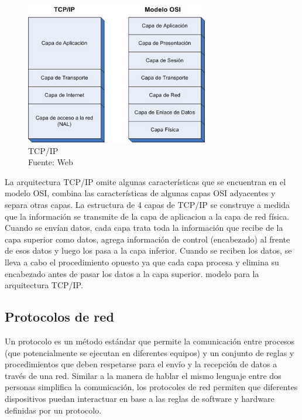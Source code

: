 \begin{figure}[H]
    \begin{center}
        \includegraphics[width=8cm]{img/capitulo_2/tcp_ip_osi.jpg}
    \end{center}
    \caption{TCP/IP\\Fuente: Web}
    \label{fig:tcpip}
\end{figure}

La arquitectura TCP/IP omite algunas características que se encuentran en el modelo OSI, combina las características de algunas capas OSI adyacentes y separa otras capas. La estructura de 4 capas de TCP/IP se construye a medida que la información se transmite de
la capa de aplicacion a la capa de red física.\\

Cuando se envían datos, cada capa trata toda la información que recibe de la capa superior como datos, agrega información de control (encabezado) al frente de esos datos y luego los pasa a la capa inferior. Cuando se reciben los datos, se lleva a cabo el procedimiento opuesto ya que cada capa procesa y elimina su encabezado antes de pasar los datos a la capa superior.
modelo para la arquitectura TCP/IP.\\

\subsection{Protocolos de red}
Un protocolo es un método estándar que permite la comunicación entre procesos (que potencialmente se ejecutan en diferentes equipos) y un conjunto de reglas y procedimientos que deben respetarse para el envío y la recepción de datos a través de una red. Similar a la manera de hablar el mismo lenguaje entre dos personas simplifica la comunicación, los protocoles de red permiten que diferentes dispositivos puedan interactuar en base a las reglas de software y hardware definidas por un protocolo.\\

